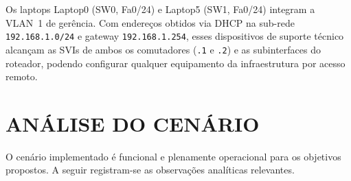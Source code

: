 \documentclass[12pt,a4paper]{article}
\begin{document}
\begin{sloppypar}
Os laptops Laptop0 (SW0, Fa0/24) e Laptop5 (SW1, Fa0/24)
integram a VLAN~1 de gerência. Com endereços obtidos via DHCP na sub-rede
\texttt{192.168.1.0/24} e gateway \texttt{192.168.1.254}, esses dispositivos
de suporte técnico alcançam as SVIs de ambos os comutadores
(\texttt{.1} e \texttt{.2}) e as subinterfaces do roteador, podendo configurar
qualquer equipamento da infraestrutura por acesso remoto.
\end{sloppypar}

\section{ANÁLISE DO CENÁRIO}

O cenário implementado é funcional e plenamente operacional para os objetivos
propostos. A seguir registram-se as observações analíticas relevantes.
\end{document}
